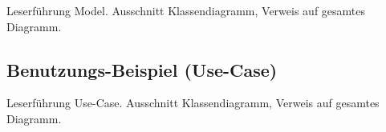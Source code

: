 Leserf\"uhrung Model.
Ausschnitt Klassendiagramm, Verweis auf gesamtes Diagramm.




\subsection{Benutzungs-Beispiel (Use-Case)}

Leserf\"uhrung Use-Case.
Ausschnitt Klassendiagramm, Verweis auf gesamtes Diagramm.


